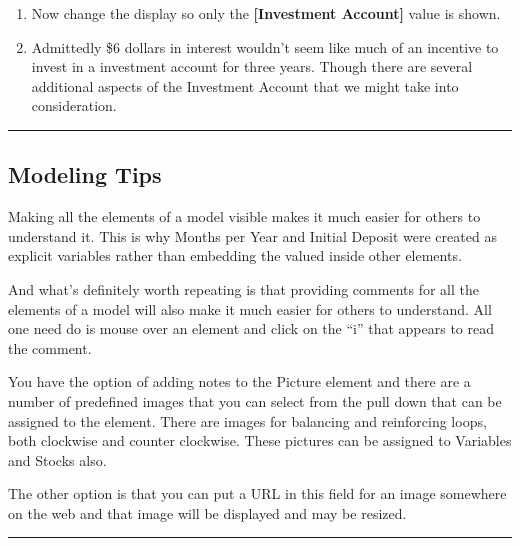 \documentclass[]{memoir}
\newcommand{\p}[1]{\textbf{{[}#1{]}}}
\begin{document}
\begin{oframed}
\begin{enumerate}
\item 

Now change the display so only the \p{Investment Account} value is shown.


\item 

Admittedly \$6 dollars in interest wouldn't seem like much of an incentive to invest in a investment account for three years. Though there are several additional aspects of the Investment Account that we might take into consideration.



\end{enumerate} \end{oframed}

\begin{center}\rule{3in}{0.4pt}\end{center}

\subsection{Modeling Tips}

Making all the elements of a model visible makes it much easier for
others to understand it. This is why Months per Year and Initial Deposit
were created as explicit variables rather than embedding the valued
inside other elements.

And what's definitely worth repeating is that providing comments for all
the elements of a model will also make it much easier for others to
understand. All one need do is mouse over an element and click on the
``i'' that appears to read the comment.

You have the option of adding notes to the Picture element and there are
a number of predefined images that you can select from the pull down
that can be assigned to the element. There are images for balancing and
reinforcing loops, both clockwise and counter clockwise. These pictures
can be assigned to Variables and Stocks also.

The other option is that you can put a URL in this field for an image
somewhere on the web and that image will be displayed and may be
resized.

\begin{center}\rule{3in}{0.4pt}\end{center}

\FloatBarrier 
\end{document}
